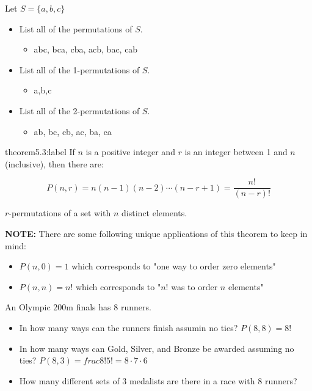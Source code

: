\begin{problem}
    Let $S=\{a,b,c\}$

    \begin{itemize}
        \item List all of the permutations of $S$.
        \begin{itemize}
            \item abc, bca, cba, acb, bac, cab
        \end{itemize}
        \item List all of the 1-permutations of $S$.
        \begin{itemize}
            \item a,b,c
        \end{itemize}
        \item List all of the 2-permutations of $S$.
        \begin{itemize}
            \item ab, bc, cb, ac, ba, ca
        \end{itemize}
    \end{itemize}
\end{problem}


\begin{theorem}{theorem5.3:label}
    If $n$ is a positive integer and $r$ is an integer between 1 and $n$ (inclusive), then there are:

    $$
    P(n,r) = n(n-1)(n-2)\cdots(n-r+1) = \frac{n!}{(n-r)!}
    $$

    $r$-permutations of a set with $n$ distinct elements.
\end{theorem}


\textbf{NOTE:} There are some following unique applications of this theorem to keep in mind:

\begin{itemize}
    \item $P(n,0) = 1$ which corresponds to "one way to order zero elements"
    \item $P(n,n) = n!$ which corresponds to "$n!$ was to order $n$ elements"
\end{itemize}


\begin{problem}
    An Olympic 200m finals has 8 runners.

    \begin{itemize}
        \item In how many ways can the runners finish assumin no ties? $P(8,8) = 8!$
        \item In how many ways can Gold, Silver, and Bronze be awarded assuming no ties? $P(8,3) = frac{8!}{5!}=8\cdot 7\cdot 6$
        \item How many different sets of 3 medalists are there in a race with 8 runners?
    \end{itemize}
\end{problem}


